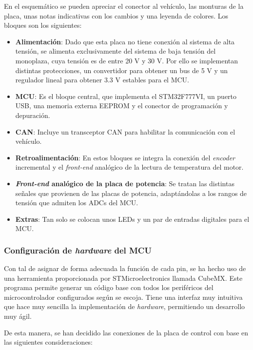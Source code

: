 En el esquemático se pueden apreciar el conector al vehículo, las monturas de la placa, unas notas indicativas con los cambios y una leyenda de colores. Los bloques son los siguientes:

\begin{itemize}
	\item \textbf{Alimentación}: Dado que esta placa no tiene conexión al sistema de alta tensión, se alimenta exclusivamente del sistema de baja tensión del monoplaza, cuya tensión es de entre 20 V y 30 V. Por ello se implementan distintas protecciones, un convertidor para obtener un bus de 5 V y un regulador lineal para obtener 3.3 V estables para el MCU.
	\item \textbf{MCU}: Es el bloque central, que implementa el STM32F777VI, un puerto USB, una memoria externa EEPROM y el conector de programación y depuración.
	\item \textbf{CAN}: Incluye un transceptor CAN para habilitar la comunicación con el vehículo.
	\item \textbf{Retroalimentación}: En estos bloques se integra la conexión del \textit{encoder} incremental y el \textit{front-end} analógico de la lectura de temperatura del motor.
	\item \textbf{\textit{Front-end} analógico de la placa de potencia}: Se tratan las distintas señales que provienen de las placas de potencia, adaptándolas a los rangos de tensión que admiten los ADCs del MCU.
	\item \textbf{Extras}: Tan solo se colocan unos LEDs y un par de entradas digitales para el MCU.
	
\end{itemize}

\subsubsection{Configuración de \textit{hardware} del MCU}

Con tal de asignar de forma adecuada la función de cada pin, se ha hecho uso de una herramienta proporcionada por STMicroelectronics llamada CubeMX. Este programa permite generar un código base con todos los periféricos del microcontrolador configurados según se escoja. Tiene una interfaz muy intuitiva que hace muy sencilla la implementación de \textit{hardware}, permitiendo un desarrollo muy ágil.

De esta manera, se han decidido las conexiones de la placa de control con base en las siguientes consideraciones:

